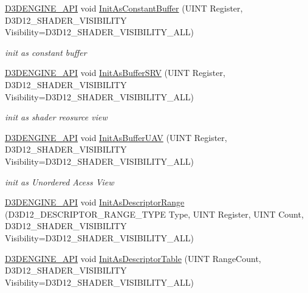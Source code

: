 \begin{DoxyCompactItemize}
\mbox{\hyperlink{stdafx_8h_a8ee2d990c5dfba7794dd2b60741d7722}{D3\+D\+E\+N\+G\+I\+N\+E\+\_\+\+A\+PI}} void \mbox{\hyperlink{class_root_parameter_ae2442f000f03c59d9e9d03c8472e8b99}{Init\+As\+Constant\+Buffer}} (U\+I\+NT Register, D3\+D12\+\_\+\+S\+H\+A\+D\+E\+R\+\_\+\+V\+I\+S\+I\+B\+I\+L\+I\+TY Visibility=D3\+D12\+\_\+\+S\+H\+A\+D\+E\+R\+\_\+\+V\+I\+S\+I\+B\+I\+L\+I\+T\+Y\+\_\+\+A\+LL)
\begin{DoxyCompactList}\small\item\em init as constant buffer \end{DoxyCompactList}\item 
\mbox{\hyperlink{stdafx_8h_a8ee2d990c5dfba7794dd2b60741d7722}{D3\+D\+E\+N\+G\+I\+N\+E\+\_\+\+A\+PI}} void \mbox{\hyperlink{class_root_parameter_a098b00557380ae92da883d5cc8d90385}{Init\+As\+Buffer\+S\+RV}} (U\+I\+NT Register, D3\+D12\+\_\+\+S\+H\+A\+D\+E\+R\+\_\+\+V\+I\+S\+I\+B\+I\+L\+I\+TY Visibility=D3\+D12\+\_\+\+S\+H\+A\+D\+E\+R\+\_\+\+V\+I\+S\+I\+B\+I\+L\+I\+T\+Y\+\_\+\+A\+LL)
\begin{DoxyCompactList}\small\item\em init as shader reosurce view \end{DoxyCompactList}\item 
\mbox{\hyperlink{stdafx_8h_a8ee2d990c5dfba7794dd2b60741d7722}{D3\+D\+E\+N\+G\+I\+N\+E\+\_\+\+A\+PI}} void \mbox{\hyperlink{class_root_parameter_ae9bb95035e93461a24c192921ebc461c}{Init\+As\+Buffer\+U\+AV}} (U\+I\+NT Register, D3\+D12\+\_\+\+S\+H\+A\+D\+E\+R\+\_\+\+V\+I\+S\+I\+B\+I\+L\+I\+TY Visibility=D3\+D12\+\_\+\+S\+H\+A\+D\+E\+R\+\_\+\+V\+I\+S\+I\+B\+I\+L\+I\+T\+Y\+\_\+\+A\+LL)
\begin{DoxyCompactList}\small\item\em init as Unordered Acess View \end{DoxyCompactList}\item 
\mbox{\hyperlink{stdafx_8h_a8ee2d990c5dfba7794dd2b60741d7722}{D3\+D\+E\+N\+G\+I\+N\+E\+\_\+\+A\+PI}} void \mbox{\hyperlink{class_root_parameter_ab10ea5c00b0d70f282495835adda4300}{Init\+As\+Descriptor\+Range}} (D3\+D12\+\_\+\+D\+E\+S\+C\+R\+I\+P\+T\+O\+R\+\_\+\+R\+A\+N\+G\+E\+\_\+\+T\+Y\+PE Type, U\+I\+NT Register, U\+I\+NT Count, D3\+D12\+\_\+\+S\+H\+A\+D\+E\+R\+\_\+\+V\+I\+S\+I\+B\+I\+L\+I\+TY Visibility=D3\+D12\+\_\+\+S\+H\+A\+D\+E\+R\+\_\+\+V\+I\+S\+I\+B\+I\+L\+I\+T\+Y\+\_\+\+A\+LL)
\item 
\mbox{\hyperlink{stdafx_8h_a8ee2d990c5dfba7794dd2b60741d7722}{D3\+D\+E\+N\+G\+I\+N\+E\+\_\+\+A\+PI}} void \mbox{\hyperlink{class_root_parameter_addad1d5c486837f4991e0ce08bf2ca27}{Init\+As\+Descriptor\+Table}} (U\+I\+NT Range\+Count, D3\+D12\+\_\+\+S\+H\+A\+D\+E\+R\+\_\+\+V\+I\+S\+I\+B\+I\+L\+I\+TY Visibility=D3\+D12\+\_\+\+S\+H\+A\+D\+E\+R\+\_\+\+V\+I\+S\+I\+B\+I\+L\+I\+T\+Y\+\_\+\+A\+LL)

\end{DoxyCompactItemize}
